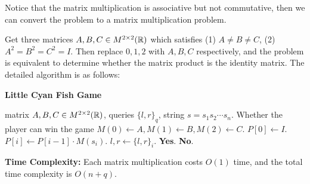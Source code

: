 \begin{answer}
    Notice that the matrix multiplication is associative but not commutative, then we can 
    convert the problem to a matrix multiplication problem.

    Get three matrices $A, B, C \in M^{2\times 2}(\mathbb{R})$ which satisfies (1) $A\neq B \neq C$, (2) $A^2 = B^2 = C^2 = I$. 
    Then replace $0, 1, 2$ with $A, B, C$ respectively, and the problem is equivalent to determine whether the matrix product is the identity matrix.
    The detailed algorithm is as follows:
    \vspace{1em}
    \begin{algo}
        \caption{\textbf{Little Cyan Fish Game}}
        \begin{algorithmic}[1]
            \Require matrix $A, B, C \in M^{2\times 2}(\mathbb{R})$, queries $\{l, r\}_q$, string $s = s_1s_2\cdots s_n$.
            \Ensure Whether the player can win the game 
            \State $M(0) \leftarrow A, M(1) \leftarrow B, M(2) \leftarrow C$.
            \State $P[0] \leftarrow I$. 
                \State $P[i] \leftarrow P[i-1]\cdot M(s_i)$.
            \EndFor
                \State $l, r \leftarrow \{l, r\}_i$.
                   
                    \State \Return \textbf{Yes}.
                \Else
                    \State \Return \textbf{No}.
                \EndIf
            \EndFor
        \end{algorithmic}
    \end{algo}
    \textbf{Time Complexity:} Each matrix multiplication costs $O(1)$ time, and the total time complexity is $O(n+q)$.

    \ed
\end{answer}